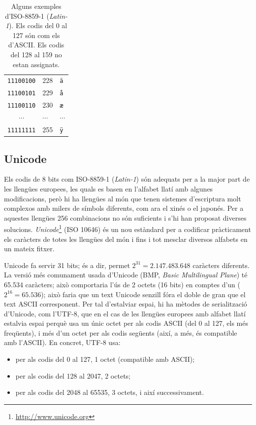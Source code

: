 \begin{table}
\begin{center}
\begin{tabular}{c|l|l}
\texttt{11100100} & 228 & \texttt{ä} \\
\texttt{11100101} & 229 & \texttt{å} \\
\texttt{11100110} & 230 & \texttt{æ} \\
$\cdots$          & $\cdots$ & $\cdots$ \\
\texttt{11111111} & 255 & \texttt{ÿ} \\
\end{tabular}
\end{center}
\caption{Alguns exemples d'ISO-8859-1 (\emph{Latin-1}). Els codis del
  0 al 127 són com els d'ASCII. Els codis del 128 al 159 no estan
  assignats.}
\label{tb:ISO88591}
\end{table}

\subsection{Unicode}
Els codis de 8 bits com ISO-8859-1 (\emph{Latin-1}) són adequats per a
la major part de les llengües europees, les quals es basen en
l'alfabet llatí amb algunes modificacions, però hi ha llengües al món
que tenen sistemes d'escriptura molt complexos amb milers de símbols
diferents, com ara el xinés o el japonés. Per a aquestes llengües 256
combinacions no són suficients i s'hi han proposat diverses solucions.
\emph{Unicode}\footnote{\url{http://www.unicode.org}} (ISO 10646) és
un nou estàndard per a codificar pràcticament els caràcters de totes
les llengües del món i fins i tot mesclar diversos alfabets en un
mateix fitxer.

Unicode fa servir 31 bits; és a dir, permet $2^{31}=2.147.483.648$
caràcters diferents. La versió més comunament usada d'Unicode (BMP,
\emph{Basic Multilingual Plane}) té 65.534 caràcters; això comportaria
l'ús de 2 octets (16 bits) en comptes d'un ($2^{16}=65.536$); això
faria que un text Unicode senzill fóra el doble de gran que el text
ASCII corresponent. Per tal d'estalviar espai, hi ha mètodes de
serialització d'Unicode, com l'UTF-8, que en el cas de les llengües
europees amb alfabet llatí estalvia espai perquè usa un únic octet per
als codis ASCII (del 0 al 127, els més freqüents), i més d'un octet
per als codis següents (així, a més, és compatible amb l'ASCII). En
concret, UTF-8 usa:
\begin{itemize}
\item per als codis del 0 al 127, 1 octet (compatible amb ASCII);
\item per als codis del 128 al 2047, 2 octets;
\item per als codis del 2048 al 65535, 3 octets, i així successivament.
\end{itemize}

